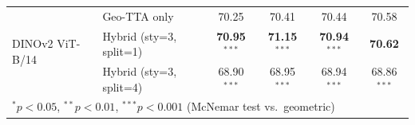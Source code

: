 \begin{table}[htbp]
{\begin{tabular}{llcccc}
\midrule
\multirow{3}{*}{DINOv2 ViT-B/14} & Geo-TTA only & 70.25 & 70.41 & 70.44 & 70.58 \\
 & Hybrid (sty=3, split=1) & \textbf{70.95$^{***}$} & \textbf{71.15$^{***}$} & \textbf{70.94$^{***}$} & \textbf{70.62} \\
 & Hybrid (sty=3, split=4) & 68.90$^{***}$ & 68.95$^{***}$ & 68.94$^{***}$ & 68.86$^{***}$ \\
\midrule
\multicolumn{6}{l}{\footnotesize $^{*}p<0.05$, $^{**}p<0.01$, $^{***}p<0.001$ (McNemar test vs.\ geometric)} \\
\bottomrule
\end{tabular}
}
\end{table}
